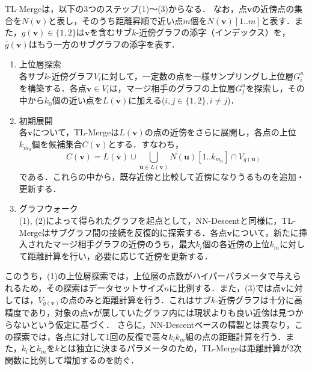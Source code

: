 \documentclass[submit,techrep,noauthor]{ipsj}
\newcommand{\vb}[1]{\boldsymbol{#1}}
\begin{document}
TL-Mergeは，以下の3つのステップ(1)〜(3)からなる．
なお，点$\vb{v}$の近傍点の集合を$N(\vb{v})$と表し，そのうち距離昇順で近い点$m$個を$N(\vb{v})[1..m]$と表す．また，$g(\vb{v})\in\{1,2\}$は$\vb{v}$を含むサブ$k$-近傍グラフの添字（インデックス）を，$\bar{g}(\vb{v})$はもう一方のサブグラフの添字を表す．
\begin{enumerate}
    \item 上位層探索\\
        各サブ$k$-近傍グラフ$V_i$に対して，一定数の点を一様サンプリングし上位層$G^u_i$を構築する．各点$\vb{v}\in V_i$は，マージ相手のグラフの上位層$G^u_j$を探索し，その中から$k_0$個の近い点を$L(\vb{v})$に加える($i,j\in\{1,2\}, i\neq j$)．
    \item 初期展開\\
        各$\vb{v}$について，TL-Mergeは$L(\vb{v})$の点の近傍をさらに展開し，各点の上位$k_{m_0}$個を候補集合$C(\vb{v})$とする．すなわち，
        \begin{equation*}
            C(\vb{v}) = L(\vb{v}) \cup \bigcup_{\vb{u}\in L(\vb{v})} N(\vb{u})[1..k_{m_0}]\cap V_{g(\vb{u})}
        \end{equation*}
		である．これらの中から，既存近傍と比較して近傍になりうるものを追加・更新する．
	\item グラフウォーク\\
        (1), (2)によって得られたグラフを起点として，NN-Descentと同様に，TL-Mergeはサブグラフ間の接続を反復的に探索する．各点$\vb{v}$について，新たに挿入されたマージ相手グラフの近傍のうち，最大$k_l$個の各近傍の上位$k_m$に対して距離計算を行い，必要に応じて近傍を更新する．
\end{enumerate}
このうち，(1)の上位層探索では，上位層の点数がハイパーパラメータで与えられるため，その探索はデータセットサイズ$n$に比例する．また，(3)では点$\vb{v}$に対しては，$V_{\bar{g}(\vb{v})}$の点のみと距離計算を行う．これはサブ$k$-近傍グラフは十分に高精度であり，対象の点$\vb{v}$が属していたグラフ内には現状よりも良い近傍は見つからないという仮定に基づく．
さらに，NN-Descentベースの精製とは異なり，この探索では，各点に対して1回の反復で高々$k_l k_m$組の点の距離計算を行う．また，$k_l$と$k_m$を$k$とは独立に決まるパラメータのため，TL-Mergeは距離計算が2次関数に比例して増加するのを防ぐ．
\end{document}
